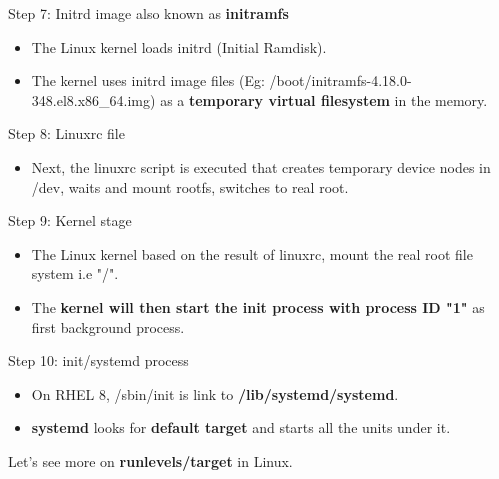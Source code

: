 \begin{flushleft}
Step 7: Initrd image also known as \textbf{initramfs}
\begin{itemize}	
	\item The Linux kernel loads initrd (Initial Ramdisk).
	\item The kernel uses initrd image files (Eg: /boot/initramfs-4.18.0-348.el8.x86\_64.img) as a \textbf{temporary virtual filesystem} in the memory.
\end{itemize}

Step 8: Linuxrc file
\begin{itemize}
	\item Next, the linuxrc script is executed that creates temporary device nodes in /dev, waits and mount rootfs, switches to real root.
\end{itemize}
\newpage
Step 9: Kernel stage
\begin{itemize}
	\item The Linux kernel based on the result of linuxrc, mount the real root file system i.e "/".
	\item The \textbf{kernel will then start the init process with process ID "1"} as first background process.
\end{itemize}

Step 10: init/systemd process
\begin{itemize}
	\item On RHEL 8, /sbin/init is link to \textbf{/lib/systemd/systemd}.
	\item \textbf{systemd} looks for \textbf{default target} and starts all the units under it.
\end{itemize}


Let's see more on \textbf{runlevels/target} in Linux.

\end{flushleft}


